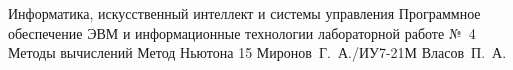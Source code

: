 \documentclass{bmstu}
\begin{document}
\makereporttitle
    {Информатика, искусственный интеллект и системы управления}
    {Программное обеспечение ЭВМ и информационные технологии}
    {лабораторной работе №~4}
    {Методы вычислений}
    {Метод Ньютона}
    {15}
    {Миронов~Г.~А./ИУ7-21М}
    {Власов~П.~А.}


\end{document}
